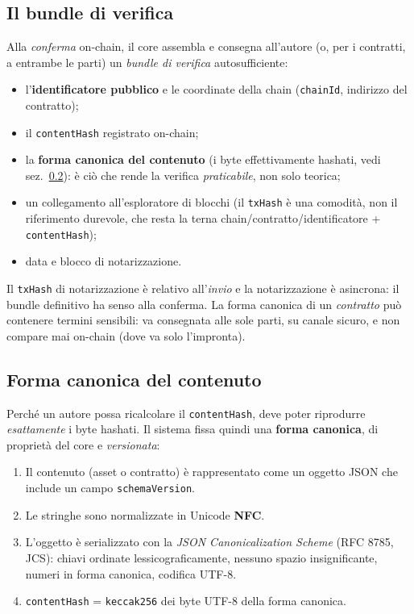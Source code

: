 \documentclass[a4paper,11pt]{article}
\begin{document}
\subsection{Il bundle di verifica}

Alla \emph{conferma} on-chain, il core assembla e consegna all'autore (o, per i contratti, a entrambe le parti) un \emph{bundle di verifica} autosufficiente:

\begin{itemize}[leftmargin=*, itemsep=0.1em]
    \item l'\textbf{identificatore pubblico} e le coordinate della chain (\texttt{chainId}, indirizzo del contratto);
    \item il \texttt{contentHash} registrato on-chain;
    \item la \textbf{forma canonica del contenuto} (i byte effettivamente hashati, vedi sez.~\ref{sec:canonica}): \`e ci\`o che rende la verifica \emph{praticabile}, non solo teorica;
    \item un collegamento all'esploratore di blocchi (il \texttt{txHash} \`e una comodit\`a, non il riferimento durevole, che resta la terna chain/contratto/identificatore + \texttt{contentHash});
    \item data e blocco di notarizzazione.
\end{itemize}

\noindent Il \texttt{txHash} di notarizzazione \`e relativo all'\emph{invio} e la notarizzazione \`e asincrona: il bundle definitivo ha senso alla conferma. La forma canonica di un \emph{contratto} pu\`o contenere termini sensibili: va consegnata alle sole parti, su canale sicuro, e non compare mai on-chain (dove va solo l'impronta).

\subsection{Forma canonica del contenuto}\label{sec:canonica}

Perch\'e un autore possa ricalcolare il \texttt{contentHash}, deve poter riprodurre \emph{esattamente} i byte hashati. Il sistema fissa quindi una \textbf{forma canonica}, di propriet\`a del core e \emph{versionata}:

\begin{enumerate}[leftmargin=*, itemsep=0.1em]
    \item Il contenuto (asset o contratto) \`e rappresentato come un oggetto JSON che include un campo \texttt{schemaVersion}.
    \item Le stringhe sono normalizzate in Unicode \textbf{NFC}.
    \item L'oggetto \`e serializzato con la \emph{JSON Canonicalization Scheme} (RFC 8785, JCS): chiavi ordinate lessicograficamente, nessuno spazio insignificante, numeri in forma canonica, codifica UTF-8.
    \item \texttt{contentHash} = \texttt{keccak256} dei byte UTF-8 della forma canonica.
\end{enumerate}
\end{document}
